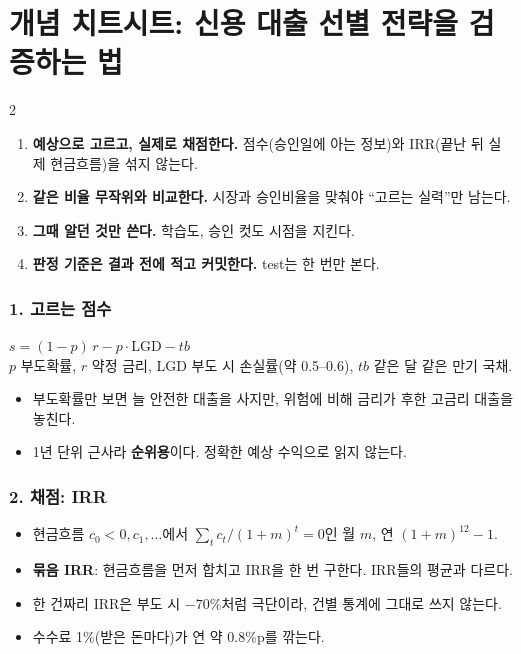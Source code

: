 \chapter{개념 치트시트: 신용 대출 선별 전략을 검증하는 법}
\begingroup\small{}\setlength{\columnsep}{6mm}

\raggedcolumns
\titlespacing*{\subsection}{0pt}{6pt}{2pt}
\begin{multicols}{2}\raggedright\small

\begin{keybox}[딱 이것만]
\begin{enumerate}
\item \textbf{예상으로 고르고, 실제로 채점한다.} 점수(승인일에 아는 정보)와 IRR(끝난 뒤 실제 현금흐름)을 섞지 않는다.
\item \textbf{같은 비율 무작위와 비교한다.} 시장과 승인비율을 맞춰야 ``고르는 실력''만 남는다.
\item \textbf{그때 알던 것만 쓴다.} 학습도, 승인 컷도 시점을 지킨다.
\item \textbf{판정 기준은 결과 전에 적고 커밋한다.} test는 한 번만 본다.
\end{enumerate}
\end{keybox}

\subsection*{1. 고르는 점수}
\begin{formulabox}[기대수익 점수]
$s=(1-p)\,r-p\cdot\mathrm{LGD}-tb$\\
$p$ 부도확률, $r$ 약정 금리, LGD 부도 시 손실률(약 0.5--0.6), $tb$ 같은 달 같은 만기 국채.
\end{formulabox}
\begin{itemize}
\item 부도확률만 보면 늘 안전한 대출을 사지만, 위험에 비해 금리가 후한 고금리 대출을 놓친다.
\item 1년 단위 근사라 \textbf{순위용}이다. 정확한 예상 수익으로 읽지 않는다.
\end{itemize}

\subsection*{2. 채점: IRR}
\begin{itemize}
\item 현금흐름 $c_0<0, c_1, \ldots$에서 $\sum_t c_t/(1+m)^t=0$인 월 $m$, 연 $(1+m)^{12}-1$.
\item \textbf{묶음 IRR}: 현금흐름을 먼저 합치고 IRR을 한 번 구한다. IRR들의 평균과 다르다.
\item 한 건짜리 IRR은 부도 시 $-70\%$처럼 극단이라, 건별 통계에 그대로 쓰지 않는다.
\item 수수료 1\%(받은 돈마다)가 연 약 0.8\%p를 깎는다.
\end{itemize}


\end{multicols}
